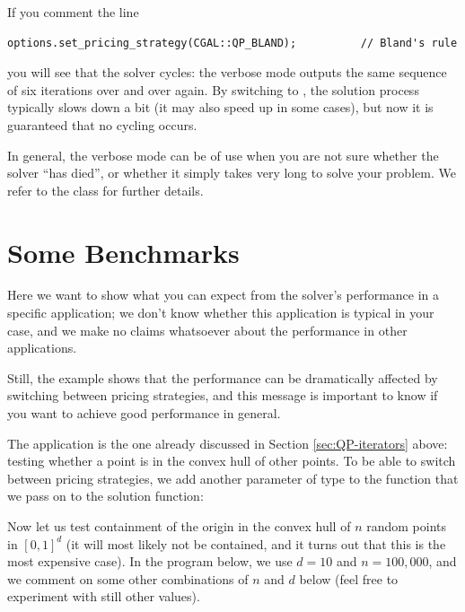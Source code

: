 
If you comment the line 
\begin{verbatim}
options.set_pricing_strategy(CGAL::QP_BLAND);          // Bland's rule
\end{verbatim}
you will see that the solver cycles: the verbose mode outputs the same
sequence of six iterations over and over again. By switching to 
, the solution process typically slows down a bit 
(it may also speed up in some cases), but now it is guaranteed that
no cycling occurs.

In general, the verbose mode can be of use when you are not sure whether 
the solver ``has died'', or whether it simply takes very long to solve
your problem.  We refer to the class 
for further details.

\section{Some Benchmarks\label{sec:QP-benchmark}}
Here we want to show what you can expect from the solver's performance
in a specific application; we don't know whether this application is 
typical in your case, and we make no claims whatsoever about the 
performance in other applications.

Still, the example shows that the performance can be dramatically 
affected by switching between pricing strategies, and this message
is important to know if you want to achieve good performance in 
general. 

The application is the one already discussed in Section \ref{sec:QP-iterators}
above: testing whether a point is in the convex hull of other points.
To be able to switch between pricing strategies, we add another
parameter of type  to the function
 that we pass on to the solution
function:


Now let us test containment of the origin in the convex hull
of $n$ random points in $[0,1]^d$ (it will most likely not be contained,
and it turns out that this is the most expensive case). In the program
below, we use $d=10$ and $n=100,000$, and we comment on some other
combinations of $n$ and $d$ below (feel free to experiment with still other
values).


